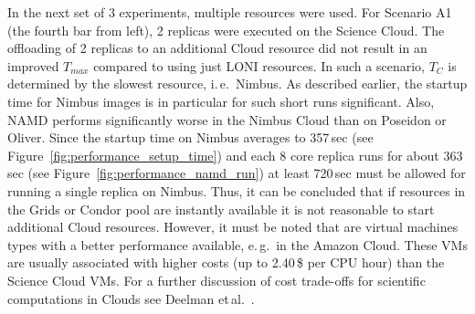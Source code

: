 \documentclass[conference,final]{IEEEtran}
\newcommand{\tc}{$T_{C}$ }
\begin{document}
In the next set of 3 experiments, multiple resources were used. For
Scenario A1 (the fourth bar from left), 2 replicas were executed on
the Science Cloud. The offloading of 2 replicas to an additional Cloud
resource did not result in an improved $T_{max}$ compared to using
just LONI resources. In such a scenario,
\tc is determined by the slowest resource, i.\,e.\ Nimbus. As
described earlier, the startup time for Nimbus images is in particular
for such short runs significant. Also, NAMD performs significantly
worse in the Nimbus Cloud than on Poseidon or Oliver. Since the
startup time on Nimbus averages to 357\,sec (see
Figure~\ref{fig:performance_setup_time}) and each 8 core replica runs
for about 363\,sec (see Figure~\ref{fig:performance_namd_run}) at
least 720\,sec must be allowed for running a single replica on
Nimbus. Thus, it can be concluded that if resources in the Grids or
Condor pool are instantly available it is not reasonable to start
additional Cloud resources.  However, it must be noted that are
virtual machines types with a better performance available, e.\,g.\ in
the Amazon Cloud. These VMs are usually associated with higher costs
(up to 2.40\,\$ per CPU hour) than the Science Cloud VMs. For a
further discussion of cost trade-offs for scientific computations in
Clouds see Deelman et\,al.~\cite{1413421}.


\end{document}
